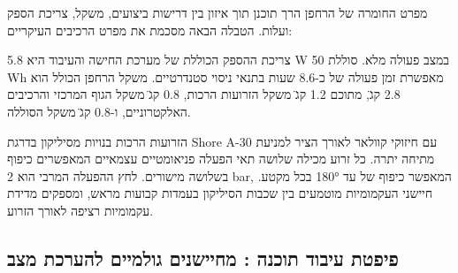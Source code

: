 מפרט החומרה של הרחפן הרך תוכנן תוך איזון בין דרישות ביצועים, משקל, צריכת הספק ועלות. הטבלה הבאה מסכמת את מפרט הרכיבים העיקריים:

\begin{table}[htbp]
\centering
\caption{מפרט רכיבי חומרה עיקריים של הרחפן הרך.}
\label{tab:ch07_hardware_specs}
\end{table}

צריכת ההספק הכוללת של מערכת החישה והעיבוד היא 5.8 W במצב פעולה מלא. סוללת 50 Wh מאפשרת זמן פעולה של כ-8.6 שעות בתנאי ניסוי סטנדרטיים. משקל הרחפן הכולל הוא 2.8 ק\"ג, מתוכם 1.2 ק\"ג משקל הזרועות הרכות, 0.8 ק\"ג משקל הגוף המרכזי והרכיבים האלקטרוניים, ו-0.8 ק\"ג משקל הסוללה.

הזרועות הרכות בנויות מסיליקון בדרגת Shore A-30 עם חיזוקי קוולאר לאורך הציר למניעת מתיחה יתרה. כל זרוע מכילה שלושה תאי הפעלה פניאומטיים עצמאיים המאפשרים כיפוף בשלושה מישורים. לחץ ההפעלה המרבי הוא 2 bar, המאפשר כיפוף של עד 180° בכל מקטע. חיישני העקמומיות מוטמעים בין שכבות הסיליקון בעמדות קבועות מראש, ומספקים מדידת עקמומיות רציפה לאורך הזרוע.

\subsection{פיפטת עיבוד תוכנה : מחיישנים גולמיים להערכת מצב}
\label{sec:ch07_pipeline}

